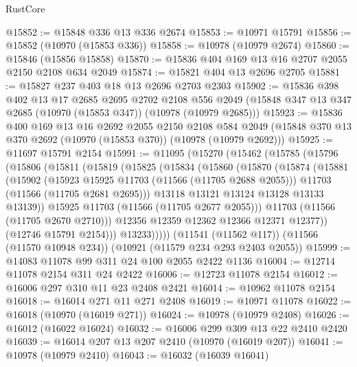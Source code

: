 \begin{lexlean}{RustCore}
\begin{coremodule}
@15852 := @15848 @336 @13 @336 @2674
@15853 := @10971 @15791
@15856 := @15852 (@10970 (@15853 @336))
@15858 := @10978 (@10979 @2674)
@15860 := @15846 (@15856 @15858)
@15870 := @15836 @404 @169 @13 @16 @2707 @2055 @2150 @2108 @634 @2049
@15874 := @15821 @404 @13 @2696 @2705
@15881 := @15827 @237 @403 @18 @13 @2696 @2703 @2303
@15902 := @15836
    @398
    @402
    @13
    @17
    @2685
    @2695
    @2702
    @2108
    @556
    @2049
    (@15848 @347 @13 @347 @2685 (@10970 (@15853 @347)) (@10978 (@10979 @2685)))
@15923 := @15836
    @400
    @169
    @13
    @16
    @2692
    @2055
    @2150
    @2108
    @584
    @2049
    (@15848 @370 @13 @370 @2692 (@10970 (@15853 @370)) (@10978 (@10979 @2692)))
@15925 := @11697 @15791 @2154
@15991 := @11095
    (@15270
      (@15462
        (@15785
          (@15796
            (@15806
              (@15811
                (@15819
                  (@15825
                    (@15834
                      (@15860
                        (@15870
                          (@15874
                            (@15881
                              (@15902
                                (@15923 @15925 @11703 (@11566 (@11705 @2688 @2055)))
                                @11703
                                (@11566 (@11705 @2681 @2695)))
                              @13118
                              @13121
                              @13124
                              @13128
                              @13133
                              @13139))
                          @15925
                          @11703
                          (@11566 (@11705 @2677 @2055)))
                        @11703
                        (@11566 (@11705 @2670 @2710)))
                      @12356
                      @12359
                      @12362
                      @12366
                      @12371
                      @12377))
                  (@12746 @15791 @2154)))
              @13233)))))
    (@11541 (@11562 @117))
    (@11566 (@11570 @10948 @234))
    (@10921 (@11579 @234 @293 @2403 @2055))
@15999 := @14083 @11078 @99 @311 @24 @100 @2055 @2422 @1136
@16004 := @12714 @11078 @2154 @311 @24 @2422
@16006 := @12723 @11078 @2154
@16012 := @16006 @297 @310 @11 @23 @2408 @2421
@16014 := @10962 @11078 @2154
@16018 := @16014 @271 @11 @271 @2408
@16019 := @10971 @11078
@16022 := @16018 (@10970 (@16019 @271))
@16024 := @10978 (@10979 @2408)
@16026 := @16012 (@16022 @16024)
@16032 := @16006 @299 @309 @13 @22 @2410 @2420
@16039 := @16014 @207 @13 @207 @2410 (@10970 (@16019 @207))
@16041 := @10978 (@10979 @2410)
@16043 := @16032 (@16039 @16041)

\end{coremodule}
\end{lexlean}
